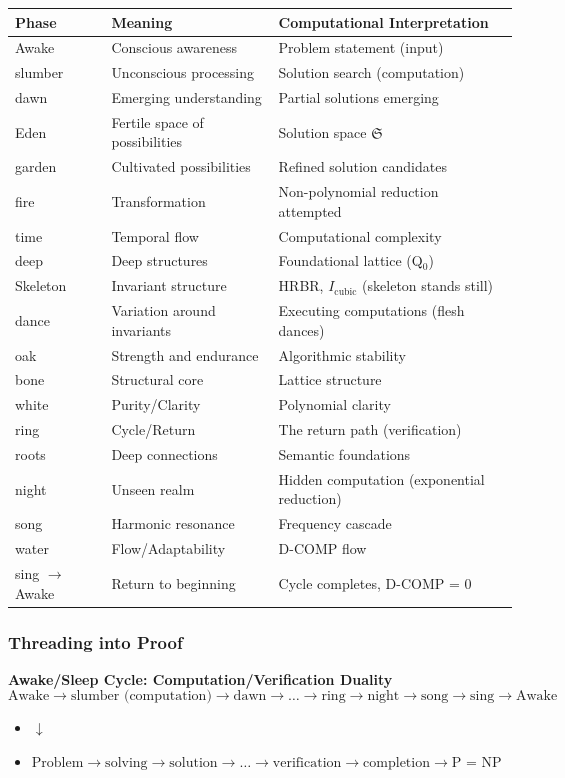 \documentclass[11pt, letterpaper]{article}
\begin{document}
\begin{table}[h]
\centering
\begin{tabular}{llp{6cm}}
\toprule
Phase & Meaning & Computational Interpretation \\
\midrule
Awake & Conscious awareness & Problem statement (input) \\
slumber & Unconscious processing & Solution search (computation) \\
dawn & Emerging understanding & Partial solutions emerging \\
Eden & Fertile space of possibilities & Solution space $\mathfrak{S}$ \\
garden & Cultivated possibilities & Refined solution candidates \\
fire & Transformation & Non-polynomial reduction attempted \\
time & Temporal flow & Computational complexity \\
deep & Deep structures & Foundational lattice (Q$_0$) \\
Skeleton & Invariant structure & HRBR, $I_{\text{cubic}}$ (skeleton stands still) \\
dance & Variation around invariants & Executing computations (flesh dances) \\
oak & Strength and endurance & Algorithmic stability \\
bone & Structural core & Lattice structure \\
white & Purity/Clarity & Polynomial clarity \\
ring & Cycle/Return & The return path (verification) \\
roots & Deep connections & Semantic foundations \\
night & Unseen realm & Hidden computation (exponential reduction) \\
song & Harmonic resonance & Frequency cascade \\
water & Flow/Adaptability & D-COMP flow \\
sing $\to$ Awake & Return to beginning & Cycle completes, D-COMP = 0 \\
\bottomrule
\end{tabular}
\end{table}

\subsubsection{Threading into Proof}

\textbf{Awake/Sleep Cycle: Computation/Verification Duality}
\begin{equation}
\text{Awake} \to \text{slumber (computation)} \to \text{dawn} \to \dots \to \text{ring} \to \text{night} \to \text{song} \to \text{sing} \to \text{Awake}
\end{equation}
\begin{itemize}
    \item $\downarrow$
    \item $\text{Problem} \to \text{solving} \to \text{solution} \to \dots \to \text{verification} \to \text{completion} \to \text{P = NP}$
\end{itemize}
\end{document}
